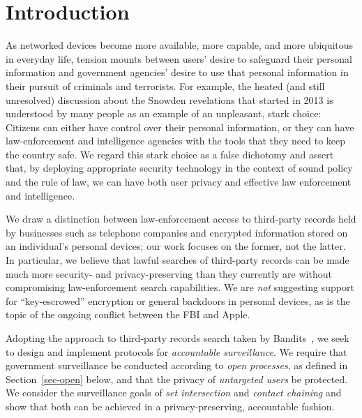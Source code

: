 \section{Introduction}\label{sec-introduction}
As networked devices become more available, more capable, and more ubiquitous
in everyday life, tension mounts between users' desire to safeguard their 
personal information and government agencies' desire to use that personal 
information in their pursuit of criminals and terrorists.  For example, 
the heated (and still unresolved) discussion about the Snowden 
revelations that started in 2013 is understood by many people
as an example of an unpleasant, stark choice: Citizens can either have
control over their personal information, or they can have
law-enforcement and intelligence agencies with the tools that they need to
keep the country safe. We regard this stark choice as a false dichotomy and 
assert that, by deploying appropriate security technology in the context of 
sound policy and the rule of law, we can have both user privacy and effective 
law enforcement and intelligence.

We draw a distinction between law-enforcement access to
third-party records held by businesses such as telephone companies
and encrypted information stored on an individual's personal devices;
our work focuses on the former, not the latter.
In particular, we believe that lawful searches of third-party records
can be made much more security- and privacy-preserving than they currently are
without compromising law-enforcement search capabilities.
We are {\em not} suggesting support for ``key-escrowed'' encryption
or general backdoors in personal devices,
as is the topic of the ongoing conflict between the FBI and Apple.

Adopting the approach to third-party records search
taken by Bandits~\cite{sff-foci2014},
we seek to design and implement protocols for {\it accountable surveillance}.
We require that government surveillance be conducted according to {\it open
processes}, as defined in Section~\ref{sec-open} below, and that the privacy
of {\it untargeted users} be protected.  We consider the surveillance goals
of {\it set intersection} and {\it contact chaining} and show that both can 
be achieved in a privacy-preserving, accountable fashion.

